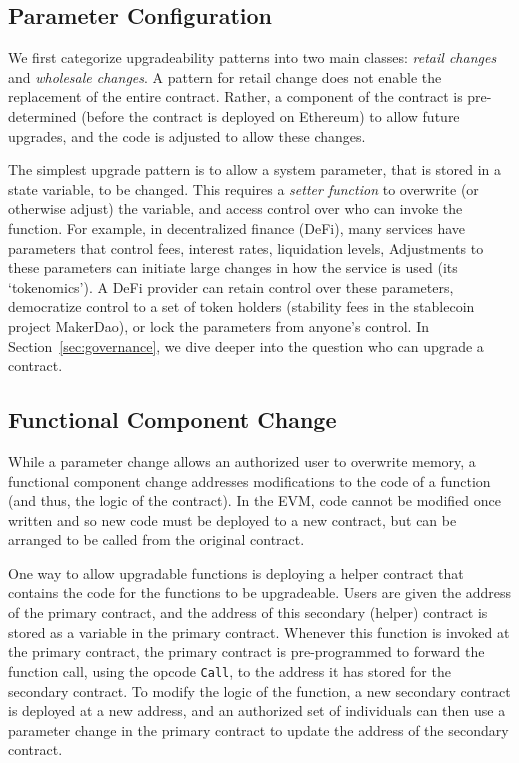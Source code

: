 
\subsection{Parameter Configuration}
\label{sec:parameter}

We first categorize upgradeability patterns into two main classes: \textit{retail changes} and \textit{wholesale changes}. A pattern for retail change does not enable the replacement of the entire contract. Rather, a component of the contract is pre-determined (before the contract is deployed on Ethereum) to allow future upgrades, and the code is adjusted to allow these changes. 

The simplest upgrade pattern is to allow a system parameter, that is stored in a state variable, to be changed. This requires a \textit{setter function} to overwrite (or otherwise adjust) the variable, and access control over who can invoke the function. For example, in decentralized finance (DeFi), many services have parameters that control fees, interest rates, liquidation levels, \etc Adjustments to these parameters can initiate large changes in how the service is used (its `tokenomics'). A DeFi provider can retain control over these parameters, democratize control to a set of token holders (\eg stability fees in the stablecoin project MakerDao), or lock the parameters from anyone's control. In Section~\ref{sec:governance}, we dive deeper into the question who can upgrade a contract. 


\subsection{Functional Component Change}
\label{sec:component}

While a parameter change allows an authorized user to overwrite memory, a functional component change addresses modifications to the code of a function (and thus, the logic of the contract). In the EVM, code cannot be modified once written and so new code must be deployed to a new contract, but can be arranged to be called from the original contract. 

One way to allow upgradable functions is deploying a helper contract that contains the code for the functions to be upgradeable. Users are given the address of the primary contract, and the address of this secondary (helper) contract is stored as a variable in the primary contract. Whenever this function is invoked at the primary contract, the primary contract is pre-programmed to forward the function call, using the opcode \texttt{Call}, to the address it has stored for the secondary contract. To modify the logic of the function, a new secondary contract is deployed at a new address, and an authorized set of individuals can then use a parameter change in the primary contract to update the address of the secondary contract.

